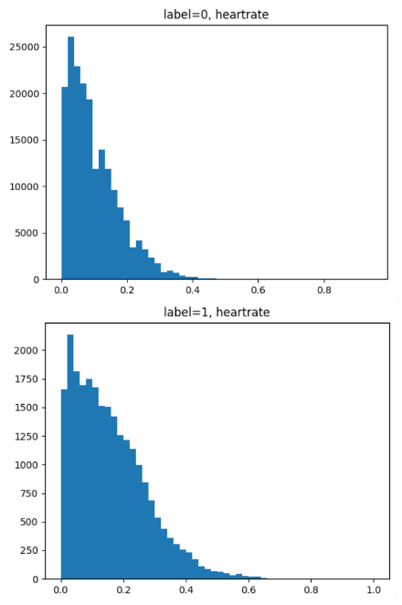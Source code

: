 \documentclass[UTF8]{article}
\begin{document}
\begin{figure}[h]
    \centering
    \begin{minipage}{.43\linewidth}
        \centering
        \includegraphics[width=\linewidth]{../attr_0.png}
    \end{minipage}
    \begin{minipage}{.43\linewidth}
        \centering
        \includegraphics[width=\linewidth]{../attr_1.png}
    \end{minipage}
\end{figure}
\end{document}
